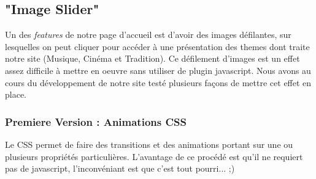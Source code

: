 \documentclass{scrartcl}
\begin{document}
\subsection{"Image Slider"}
Un des \textit{features} de notre page d'accueil est d'avoir des images défilantes, sur lesquelles on peut cliquer pour accéder à une présentation des themes dont traite  notre site (Musique, Cinéma et Tradition). Ce défilement d'images est un effet assez difficile à mettre en oeuvre sans utiliser de plugin javascript. Nous avons au cours du développement de notre site testé plusieurs façons de mettre cet effet en place.
\subsubsection{Premiere Version : Animations CSS}
Le CSS permet de faire des transitions et des animations portant sur une ou plusieurs propriétés particulières. L'avantage de ce procédé est qu'il ne requiert pas de javascript, l'inconvéniant est que c'est tout pourri... ;)
\end{document}
